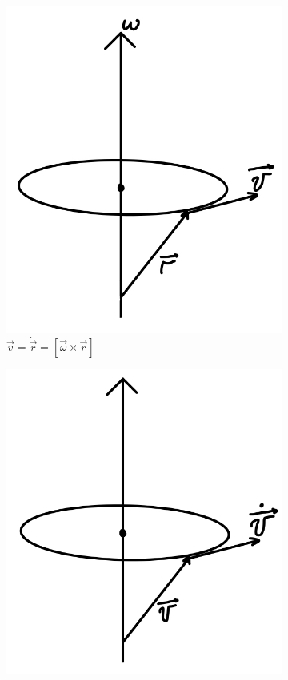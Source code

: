 \begin{figure}[h!]
    \centering
    \begin{subfigure}{0.45\textwidth}
        \includegraphics[width=\textwidth]{im/58.png} %
        \caption*{\(\vec{v}=\dot{\vec{r}}=[\vec{\omega}\times \vec{r}] \)}
        \label{fig:sub1}
    \end{subfigure}
    \hfill
    \begin{subfigure}{0.45\textwidth}
        \includegraphics[width=\textwidth]{im/59.png} %

\end{subfigure}
\end{figure}
